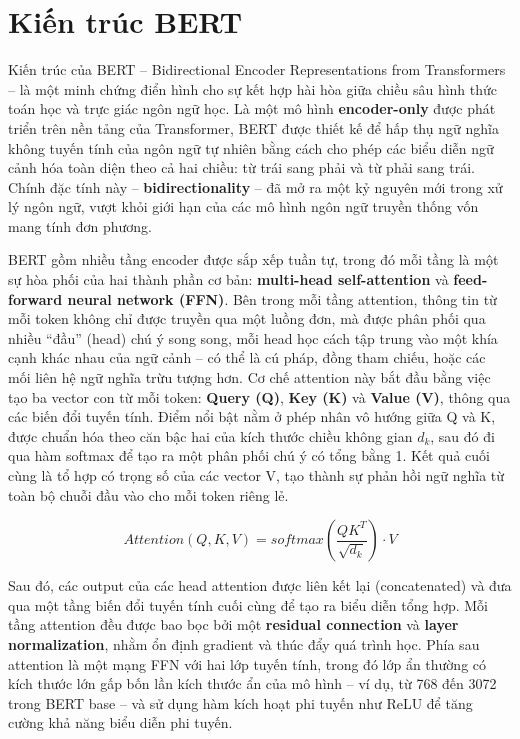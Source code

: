 \section{Kiến trúc BERT}
Kiến trúc của BERT -- Bidirectional Encoder Representations from Transformers -- là một minh chứng điển hình cho sự kết hợp hài hòa giữa chiều sâu hình thức toán học và trực giác ngôn ngữ học. Là một mô hình \textbf{encoder-only} được phát triển trên nền tảng của Transformer, BERT được thiết kế để hấp thụ ngữ nghĩa không tuyến tính của ngôn ngữ tự nhiên bằng cách cho phép các biểu diễn ngữ cảnh hóa toàn diện theo cả hai chiều: từ trái sang phải và từ phải sang trái. Chính đặc tính này -- \textbf{bidirectionality} -- đã mở ra một kỷ nguyên mới trong xử lý ngôn ngữ, vượt khỏi giới hạn của các mô hình ngôn ngữ truyền thống vốn mang tính đơn phương.

BERT gồm nhiều tầng encoder được sắp xếp tuần tự, trong đó mỗi tầng là một sự hòa phối của hai thành phần cơ bản: \textbf{multi-head self-attention} và \textbf{feed-forward neural network (FFN)}. Bên trong mỗi tầng attention, thông tin từ mỗi token không chỉ được truyền qua một luồng đơn, mà được phân phối qua nhiều ``đầu'' (head) chú ý song song, mỗi head học cách tập trung vào một khía cạnh khác nhau của ngữ cảnh -- có thể là cú pháp, đồng tham chiếu, hoặc các mối liên hệ ngữ nghĩa trừu tượng hơn. Cơ chế attention này bắt đầu bằng việc tạo ba vector con từ mỗi token: \textbf{Query (Q)}, \textbf{Key (K)} và \textbf{Value (V)}, thông qua các biến đổi tuyến tính. Điểm nổi bật nằm ở phép nhân vô hướng giữa Q và K, được chuẩn hóa theo căn bậc hai của kích thước chiều không gian \(d_k\), sau đó đi qua hàm softmax để tạo ra một phân phối chú ý có tổng bằng 1. Kết quả cuối cùng là tổ hợp có trọng số của các vector V, tạo thành sự phản hồi ngữ nghĩa từ toàn bộ chuỗi đầu vào cho mỗi token riêng lẻ.

\begin{equation}
    Attention(Q, K, V) = softmax\left(\frac{QK^{T}}{\sqrt{d_{k}}}\right) \cdot V
\end{equation}

Sau đó, các output của các head attention được liên kết lại (concatenated) và đưa qua một tầng biến đổi tuyến tính cuối cùng để tạo ra biểu diễn tổng hợp. Mỗi tầng attention đều được bao bọc bởi một \textbf{residual connection} và \textbf{layer normalization}, nhằm ổn định gradient và thúc đẩy quá trình học. Phía sau attention là một mạng FFN với hai lớp tuyến tính, trong đó lớp ẩn thường có kích thước lớn gấp bốn lần kích thước ẩn của mô hình -- ví dụ, từ 768 đến 3072 trong BERT base -- và sử dụng hàm kích hoạt phi tuyến như ReLU để tăng cường khả năng biểu diễn phi tuyến.

